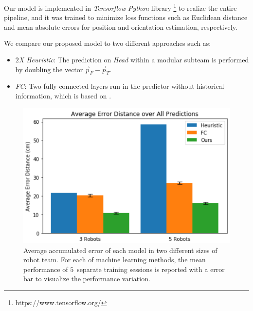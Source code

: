 \documentclass[letterpaper, 10 pt, conference]{ieeeconf}  %
\begin{document}
	Our model is implemented in \emph{Tensorflow} \emph{Python} library \footnote{https://www.tensorflow.org/} 
	to realize the entire pipeline, and it was trained to minimize 
	loss functions such as Euclidean distance and mean absolute errors 
	for position and orientation estimation, respectively.
	
	We compare our proposed model to two different approaches such as: 
	\begin{itemize}
		\item \emph{$2$X Heuristic}: 
		The prediction on \emph{Head} within a modular subteam is performed by doubling the vector 
		$\vec{p}_{F} - \vec{p}_{T}$.
		
		\item \emph{FC}: 
		Two fully connected layers run in the predictor without historical 
		information, which is based on \cite{CPR17}.  
	
	\end{itemize}	

	
	

	\begin{figure}[t]
	\centering
	\includegraphics[width=1.\columnwidth]{fig_macro_eval}
	\caption{Average accumulated error of each model in two different sizes of robot team. 
		For each of machine learning methods, the mean performance of $5$~separate training 
		sessions is reported with a error bar to visualize the performance variation. 
	}
	\label{fig:macro_eval}
	\end{figure}
\end{document}
